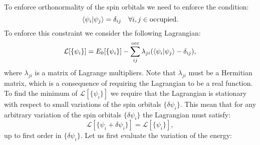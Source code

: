 \documentclass[../Main/chem532-notes.tex]{subfiles}
\begin{document}
To enforce orthonormality of the spin orbitals we need to enforce the condition:
\begin{equation}
\braket{\psi_i | \psi_j} = \delta_{ij} \quad \forall i,j \in \mathrm{occupied}.
\end{equation}
To enforce this constraint we consider the following Lagrangian:
\begin{equation}
\mathcal{L}[\{ \psi_i \}] = E_0[\{ \psi_i \}] - \sum_{ij}^\mathrm{occ} \lambda_{ji} (\braket{\psi_i | \psi_j} - \delta_{ij}),
\end{equation}
where $\lambda_{ji}$ is a matrix of Lagrange multipliers.
Note that $\lambda_{ji}$ must be a Hermitian matrix, which is a consequence of requiring the Lagrangian to be a real function.
%
To find the minimum of $\mathcal{L}[\{ \psi_i \}]$ we require that the Lagrangian is stationary with respect to small variations of the spin orbitals $\{ \delta \psi_i \}$.
This mean that for any arbitrary variation of the spin orbitals $\{ \delta \psi_i \}$ the Lagrangian must satisfy:
\begin{equation}
\mathcal{L}[\{ \psi_i  + \delta \psi_i \}] = \mathcal{L}[\{ \psi_i \}],\end{equation}
up to first order in $\{ \delta \psi_i \}$.
Let us first evaluate the variation of the energy:
\end{document}
